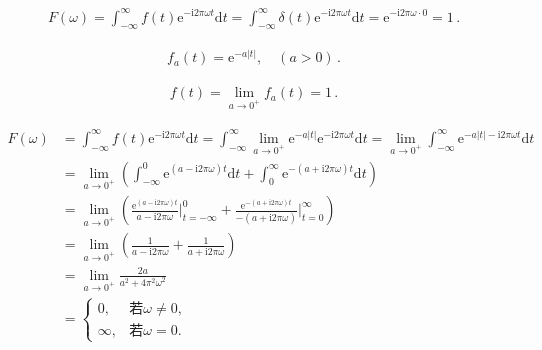 \begin{align}
    F(\omega)=\int_{-\infty}^{\infty}f(t)\mathrm{e}^{-\mathrm{i}2\pi\omega t}\mathrm{d}t
    =\int_{-\infty}^{\infty}\delta(t)\mathrm{e}^{-\mathrm{i}2\pi\omega t}\mathrm{d}t
    =\mathrm{e}^{-\mathrm{i}2\pi\omega\cdot0}
    =1\, .
\end{align}

\begin{align}
    f_a(t)=\mathrm{e}^{-a|t|},\quad (a>0)\, .
\end{align}

\begin{align}
    f(t)=\lim\limits_{a\rightarrow0^+}f_a(t)=1\, .
\end{align}

\begin{align}
    F(\omega) & =\int_{-\infty}^{\infty}f(t)\mathrm{e}^{-\mathrm{i}2\pi\omega t}\mathrm{d}t
    =\int_{-\infty}^{\infty}\lim\limits_{a\rightarrow0^+}\mathrm{e}^{-a|t|}\mathrm{e}^{-\mathrm{i}2\pi\omega t}\mathrm{d}t
    =\lim\limits_{a\rightarrow0^+}\int_{-\infty}^{\infty}\mathrm{e}^{-a|t|-\mathrm{i}2\pi\omega t}\mathrm{d}t\nonumber                                                                                  \\
              & =\lim\limits_{a\rightarrow0^+}\left(\int_{-\infty}^0\mathrm{e}^{(a-\mathrm{i}2\pi\omega)t}\mathrm{d}t+\int_0^{\infty}\mathrm{e}^{-(a+\mathrm{i}2\pi\omega)t}\mathrm{d}t\right)\nonumber \\
              & =\lim\limits_{a\rightarrow0^+}\left(\frac{\mathrm{e}^{(a-\mathrm{i}2\pi\omega)t}}{a-\mathrm{i}2\pi\omega}\bigg|_{t=-\infty}^0
    +\frac{\mathrm{e}^{-(a+\mathrm{i}2\pi\omega)t}}{-(a+\mathrm{i}2\pi\omega)}\bigg|_{t=0}^{\infty}\right)\nonumber                                                                                     \\
              & =\lim\limits_{a\rightarrow0^+}\left(\frac{1}{a-\mathrm{i}2\pi\omega}+\frac{1}{a+\mathrm{i}2\pi\omega}\right)\nonumber                                                                   \\
              & =\lim\limits_{a\rightarrow0^+}\frac{2a}{a^2+4\pi^2\omega^2}\nonumber                                                                                                                    \\
              & =\left\{\begin{array}{ll}
        0,      & \text{若}\omega\neq0, \\
        \infty, & \text{若}\omega=0.
    \end{array}\right.
\end{align}

